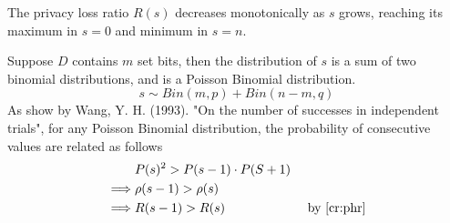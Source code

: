 \documentclass[11pt]{article}
\begin{document}
 \begin{lem} \label{lem:rs1}
The privacy loss ratio $R(s)$ decreases monotonically as $s$ grows, reaching its maximum in $s=0$ and minimum in $s=n$.
\end{lem}
\begin{pf}
 Suppose $D$ contains $m$ set bits, then the distribution of $s$ is a sum of two binomial distributions, and is  a Poisson Binomial distribution.
\begin{equation}
 s  \sim Bin(m,p) + Bin(n-m,q)  \label{lem:bpd} 
 \end{equation}
 As show by Wang, Y. H. (1993). "On the number of successes in independent trials", for any Poisson Binomial distribution, the probability of consecutive values are related as follows
 \begin{align*}
 & P(s)^2  > P(s-1) \cdot P(S+1) & \\
\implies &  \rho(s-1) > \rho(s)  & \\
\implies & R(s-1) > R(s) & \text{ by } \ref{cr:phr}
\end{align*}
\end{pf}
\end{document}
